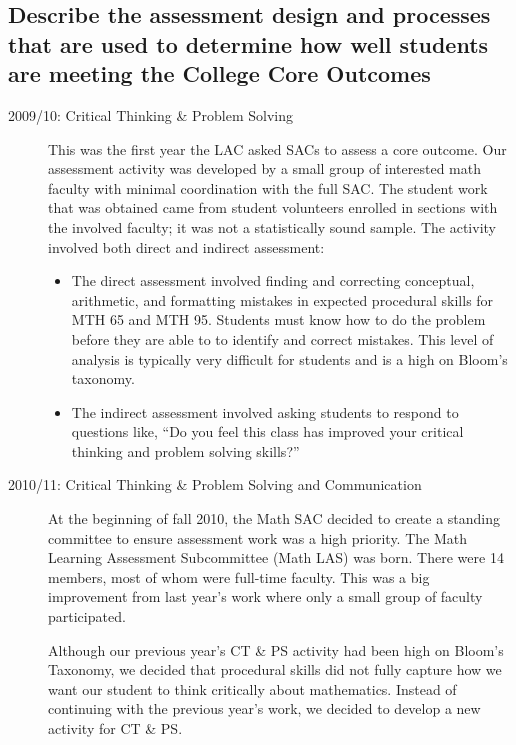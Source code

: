 \subsection{Describe the assessment design and processes that are used to
determine how well students are meeting the College Core Outcomes}

\begin{description}
\item [2009/10: Critical Thinking  \& Problem Solving]

This was the first year the LAC asked SACs to assess a core outcome. Our
assessment activity was developed by a small group of interested math faculty
with minimal coordination with the full SAC. The student work that was obtained
came from student volunteers enrolled in sections with the involved faculty; it
was not a statistically sound sample.  The activity involved both direct and
indirect assessment: 
\begin{itemize}
\item The direct assessment involved finding and correcting conceptual,
  arithmetic, and formatting mistakes in expected procedural skills for MTH 65
  and MTH 95. Students must know how to do the problem before they are able to
  to identify and correct mistakes. This level of analysis is typically very
  difficult for students and is a high on Bloom's taxonomy.

\item The indirect assessment involved asking students to respond to questions
  like, ``Do you feel this class has improved your critical thinking and problem
  solving skills?''
\end{itemize}

\item[2010/11:  Critical Thinking \& Problem Solving and Communication]

At the beginning of fall 2010, the Math SAC decided to create a standing
committee to ensure assessment work was a high priority. The Math Learning
Assessment Subcommittee (Math LAS) was born.  There were 14 members, most of
whom were full-time faculty. This was a big improvement from last year's work
where only a small group of faculty participated.

Although our previous year's CT \& PS activity had been high on Bloom's
Taxonomy, we decided that procedural skills did not fully capture how we want
our student to think critically about mathematics.  Instead of continuing with
the previous year's work, we decided to develop a new activity for CT \& PS. 


\end{description}
